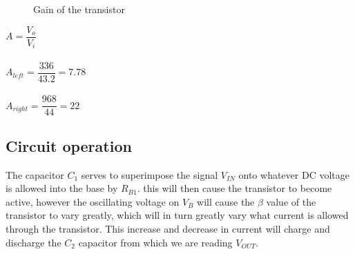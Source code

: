 \documentclass[a4paper,11pt]{article}
\begin{document}
\begin{figure}[h]
  \vspace{-5pt}
 \begin{center}
  \vspace{-24pt}
  \caption{Gain of the transistor}
 \end{center}
\end{figure}

$A = \dfrac{V_o}{V_i}$\\\\
$A_{left} = \dfrac{336}{43.2} = 7.78 $\\\\
$A_{right} = \dfrac{968}{44} = 22 $\\

\subsection{Circuit operation}

The capacitor $C_1$ serves to superimpose the signal  $V_{IN}$ onto whatever DC voltage is allowed into the base by $R_{B1}$. this will then cause the transistor to become active, however the oscillating voltage on $V_B$ will cause the $\beta$ value of the transistor to vary greatly, which will in turn greatly vary what current is allowed through the transistor. This increase and decrease in current will charge and discharge the $C_2$ capacitor from which we are reading $V_{OUT}$. 
\end{document}
